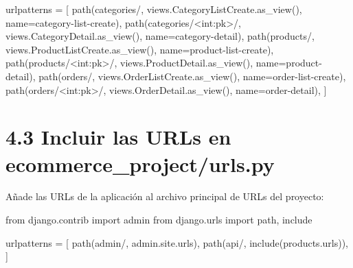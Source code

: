 \documentclass[
  a4paper,
  DIV=11,
  numbers=noendperiod,
  onepage,
  openany]{scrreprt}
\newenvironment{Shaded}{\begin{snugshade}}{\end{snugshade}}
\newcommand{\ImportTok}[1]{\textcolor[rgb]{0.00,0.46,0.62}{#1}}
\newcommand{\NormalTok}[1]{\textcolor[rgb]{0.00,0.23,0.31}{#1}}
\newcommand{\OperatorTok}[1]{\textcolor[rgb]{0.37,0.37,0.37}{#1}}
\newcommand{\StringTok}[1]{\textcolor[rgb]{0.13,0.47,0.30}{#1}}
\begin{document}
\begin{tcolorbox}
\begin{Shaded}
\begin{Highlighting}[]
\NormalTok{urlpatterns }\OperatorTok{=}\NormalTok{ [}
\NormalTok{    path(}\StringTok{\textquotesingle{}categories/\textquotesingle{}}\NormalTok{, views.CategoryListCreate.as\_view(), name}\OperatorTok{=}\StringTok{\textquotesingle{}category{-}list{-}create\textquotesingle{}}\NormalTok{),}
\NormalTok{    path(}\StringTok{\textquotesingle{}categories/\textless{}int:pk\textgreater{}/\textquotesingle{}}\NormalTok{, views.CategoryDetail.as\_view(), name}\OperatorTok{=}\StringTok{\textquotesingle{}category{-}detail\textquotesingle{}}\NormalTok{),}
\NormalTok{    path(}\StringTok{\textquotesingle{}products/\textquotesingle{}}\NormalTok{, views.ProductListCreate.as\_view(), name}\OperatorTok{=}\StringTok{\textquotesingle{}product{-}list{-}create\textquotesingle{}}\NormalTok{),}
\NormalTok{    path(}\StringTok{\textquotesingle{}products/\textless{}int:pk\textgreater{}/\textquotesingle{}}\NormalTok{, views.ProductDetail.as\_view(), name}\OperatorTok{=}\StringTok{\textquotesingle{}product{-}detail\textquotesingle{}}\NormalTok{),}
\NormalTok{    path(}\StringTok{\textquotesingle{}orders/\textquotesingle{}}\NormalTok{, views.OrderListCreate.as\_view(), name}\OperatorTok{=}\StringTok{\textquotesingle{}order{-}list{-}create\textquotesingle{}}\NormalTok{),}
\NormalTok{    path(}\StringTok{\textquotesingle{}orders/\textless{}int:pk\textgreater{}/\textquotesingle{}}\NormalTok{, views.OrderDetail.as\_view(), name}\OperatorTok{=}\StringTok{\textquotesingle{}order{-}detail\textquotesingle{}}\NormalTok{),}
\NormalTok{]}
\end{Highlighting}
\end{Shaded}

\section{4.3 Incluir las URLs en
ecommerce\_project/urls.py}\label{incluir-las-urls-en-ecommerce_projecturls.py}

Añade las URLs de la aplicación al archivo principal de URLs del
proyecto:

\begin{Shaded}
\begin{Highlighting}[]
\ImportTok{from}\NormalTok{ django.contrib }\ImportTok{import}\NormalTok{ admin}
\ImportTok{from}\NormalTok{ django.urls }\ImportTok{import}\NormalTok{ path, include}

\NormalTok{urlpatterns }\OperatorTok{=}\NormalTok{ [}
\NormalTok{    path(}\StringTok{\textquotesingle{}admin/\textquotesingle{}}\NormalTok{, admin.site.urls),}
\NormalTok{    path(}\StringTok{\textquotesingle{}api/\textquotesingle{}}\NormalTok{, include(}\StringTok{\textquotesingle{}products.urls\textquotesingle{}}\NormalTok{)),}
\NormalTok{]}
\end{Highlighting}
\end{Shaded}


\end{tcolorbox}
\end{document}
